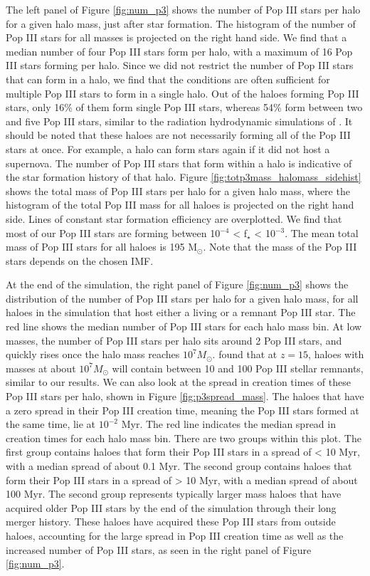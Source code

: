 \documentclass[fleqn,usenatbib]{mnras}
\begin{document}
The left panel of Figure \ref{fig:num_p3} shows the number of Pop III stars per halo for a given halo mass, just after star formation. The histogram of the number of Pop III stars for all masses is projected on the right hand side. We find that a median number of four Pop III stars form per halo, with a maximum of 16 Pop III stars forming per halo. Since we did not restrict the number of Pop III stars that can form in a halo, we find that the conditions are often sufficient for multiple Pop III stars to form in a single halo. Out of the haloes forming Pop III stars, only 16\% of them form single Pop III stars, whereas 54\% form between two and five Pop III stars, similar to the radiation hydrodynamic simulations of \citet{Susa13, Susa14}. It should be noted that these haloes are not necessarily forming all of the Pop III stars at once. For example, a halo can form stars again if it did not host a supernova. The number of Pop III stars that form within a halo is indicative of the star formation history of that halo. Figure \ref{fig:totp3mass_halomass_sidehist} shows the total mass of Pop III stars per halo for a given halo mass, where the histogram of the total Pop III mass for all haloes is projected on the right hand side. Lines of constant star formation efficiency are overplotted. We find that most of our Pop III stars are forming between 10$^{-4}$ < f$_\star$ < 10$^{-3}$. The mean total mass of Pop III stars for all haloes is 195 M$_{\odot}$. Note that the mass of the Pop III stars depends on the chosen IMF. 

At the end of the simulation, the right panel of Figure \ref{fig:num_p3} shows the distribution of the number of Pop III stars per halo for a given halo mass, for all haloes in the simulation that host either a living or a remnant Pop III star. The red line shows the median number of Pop III stars for each halo mass bin. At low masses, the number of Pop III stars per halo sits around 2 Pop III stars, and quickly rises once the halo mass reaches $10^{7} M_{\odot}$. \citet{Xu13} found that at $z = 15$, haloes with masses at about $10^{7} M_{\odot}$ will contain between 10 and 100 Pop III stellar remnants, similar to our results. We can also look at the spread in creation times of these Pop III stars per halo, shown in Figure \ref{fig:p3spread_mass}. The haloes that have a zero spread in their Pop III creation time, meaning the Pop III stars formed at the same time, lie at $10^{-2}$ Myr. The red line indicates the median spread in creation times for each halo mass bin. There are two groups within this plot. The first group contains haloes that form their Pop III stars in a spread of < 10 Myr, with a median spread of about 0.1 Myr. The second group contains haloes that form their Pop III stars in a spread of > 10 Myr, with a median spread of about 100 Myr. The second group represents typically larger mass haloes that have acquired older Pop III stars by the end of the simulation through their long merger history. These haloes have acquired these Pop III stars from outside haloes, accounting for the large spread in Pop III creation time as well as the increased number of Pop III stars, as seen in the right panel of Figure \ref{fig:num_p3}. 
\end{document}

